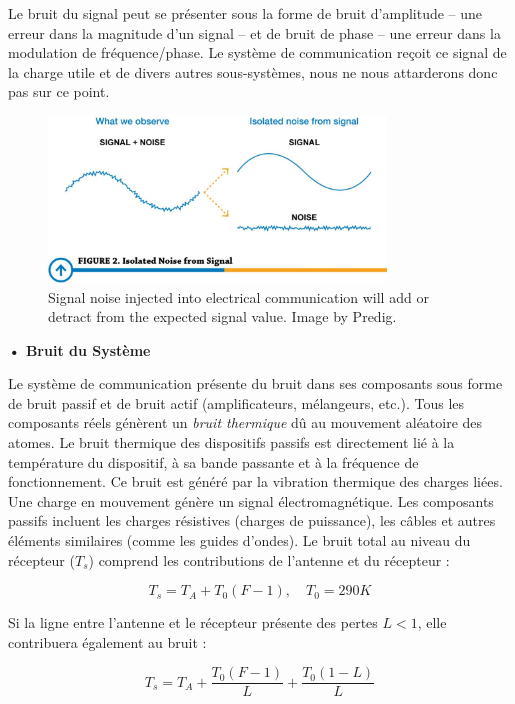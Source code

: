 Le bruit du signal peut se présenter sous la forme de bruit d'amplitude – une erreur dans la magnitude d'un signal – et de bruit de phase – une erreur dans la modulation de fréquence/phase. Le système de communication reçoit ce signal de la charge utile et de divers autres sous-systèmes, nous ne nous attarderons donc pas sur ce point.
\begin{figure}[H] %
    \centering
    \includegraphics[width=0.8\textwidth]{figures/6-60.jpg}
    
    \caption{Signal noise injected into electrical communication will add or detract from the expected signal value. Image by Predig.}
    \label{fig:communication2}
\end{figure}

\textbf{• Bruit du Système}

Le système de communication présente du bruit dans ses composants sous forme de bruit passif et de bruit actif (amplificateurs, mélangeurs, etc.). Tous les composants réels génèrent un \textit{bruit thermique} dû au mouvement aléatoire des atomes. Le bruit thermique des dispositifs passifs est directement lié à la température du dispositif, à sa bande passante et à la fréquence de fonctionnement. Ce bruit est généré par la vibration thermique des charges liées. Une charge en mouvement génère un signal électromagnétique. Les composants passifs incluent les charges résistives (charges de puissance), les câbles et autres éléments similaires (comme les guides d'ondes). Le bruit total au niveau du récepteur (\(T_s\)) comprend les contributions de l’antenne et du récepteur :

\begin{equation}
    T_s = T_A + T_0(F - 1), \quad T_0 = 290K
\end{equation}

Si la ligne entre l'antenne et le récepteur présente des pertes \(L < 1\), elle contribuera également au bruit :

\begin{equation}
    T_s = T_A + \frac{T_0(F - 1)}{L} + \frac{T_0 (1 - L)}{L}
\end{equation}

